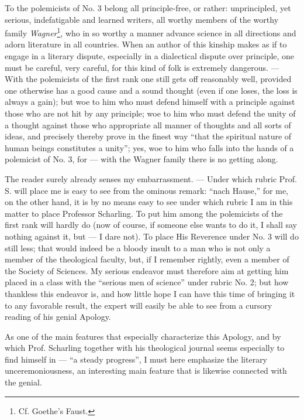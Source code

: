 \documentclass[12pt,a4paper,openany]{book}
\newcommand{\opage}[1]{\marginnote{\footnotesize\textit{[#1]}}}
\begin{document}
To the polemicists of No. 3 belong all principle-free,
or rather: unprincipled, yet serious, indefatigable and
learned writers, all worthy members of the worthy
family \emph{Wagner}\footnote[1]{Cf. Goethe's Faust.}, who in so worthy a manner %
advance science in all directions and adorn literature
in all countries. When an author of this kinship
makes as if to engage in a literary dispute, especially in a
dialectical dispute over principle, one must be careful, very careful,
for this kind of folk is extremely dangerous. --- With the polemicists
of the first rank one still gets off reasonably well,
provided one otherwise has a good cause and a sound
thought (even if one loses, the loss is always a gain); but
woe to him who must defend himself with a principle against those
who are not hit by any principle; woe to him who must defend
the unity of a thought against those who appropriate all manner of thoughts
and all sorts of ideas, and precisely thereby
prove in the finest way ``that the spiritual nature of human beings
constitutes a unity''; yes, woe to him who falls into the hands
of a polemicist of No. 3, for --- with the Wagner
family there is no getting along.

The reader surely already senses my embarrassment. --- Under which rubric Prof. S. will place me is easy to see
from the ominous remark: ``nach Hause,'' for me, on the other hand,
it is by no means easy to see under which rubric I am in this
\setcounter{footnote}{0}%
\opage{12}matter to place Professor Scharling. To put him
among the polemicists of the first rank will hardly
do (now of course, if someone else wants to do it,
I shall say nothing against it, but --- I dare not).
To place His Reverence under No. 3 will do still
less; that would indeed be a bloody insult to
a man who is not only a member of the theological faculty,
but, if I remember rightly, even a member of
the Society of Sciences. My serious endeavor must
therefore aim at getting him placed in a class with the
``serious men of science'' under rubric No. 2; but
how thankless this endeavor is, and how little
hope I can have this time of bringing it to any
favorable result, the expert will easily be able to see
from a cursory reading of his genial Apology.

As one of the main features that especially characterize
this Apology, and by which Prof. Scharling together with
his theological journal seems especially to find himself in --- ``a
steady progress'', I must here emphasize the literary
unceremoniousness, an interesting main feature that is likewise connected
with the genial.
\end{document}
